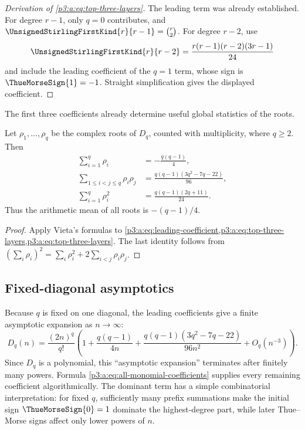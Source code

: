 \documentclass[11pt,oneside]{article}
\numberwithin{equation}{section}
\theoremstyle{definition}
\theoremstyle{remark}
\begin{document}
\begin{proof}[Derivation of \eqref{p3:a:eq:top-three-layers}]
The leading term was already established.  For degree \(r-1\), only \(q=0\)
contributes, and
\(
\UnsignedStirlingFirstKind{r}{r-1}=\binom r2
\).
For degree \(r-2\), use
\[
 \UnsignedStirlingFirstKind{r}{r-2}
 =\frac{r(r-1)(r-2)(3r-1)}{24}
\]
and include the leading coefficient of the \(q=1\) term, whose sign is
\(\ThueMorseSign{1}=-1\).  Straight simplification gives the displayed coefficient.
\end{proof}
The first three coefficients already determine useful global statistics of
the roots.

\begin{corollary}
Let \(\rho_1,\ldots,\rho_q\) be the complex roots of \(D_q\), counted
with multiplicity, where \(q\geq2\).  Then
\begin{align}
 \sum_{i=1}^{q}\rho_i
   &=-\frac{q(q-1)}4,                                      \label{p3:c:eq:root-sum}\\
 \sum_{1\leq i<j\leq q}\rho_i\rho_j
   &=\frac{q(q-1)(3q^2-7q-22)}{96},                        \label{p3:c:eq:root-e2}\\
 \sum_{i=1}^{q}\rho_i^2
   &=\frac{q(q-1)(2q+11)}{24}.                             \label{p3:c:eq:root-square-sum}
\end{align}
Thus the arithmetic mean of all roots is \(-(q-1)/4\).
\end{corollary}

\begin{proof}
Apply Vieta's formulas to \cref{p3:a:eq:leading-coefficient,p3:a:eq:top-three-layers,p3:a:eq:top-three-layers}.  The last
identity follows from
\((\sum_i\rho_i)^2=\sum_i\rho_i^2+2\sum_{i<j}\rho_i\rho_j\).
\end{proof}
\subsection{Fixed-diagonal asymptotics}

Because \(q\) is fixed on one diagonal, the leading coefficients give a
finite asymptotic expansion as \(n\to\infty\):
\begin{equation}
 D_q(n)=\frac{(2n)^q}{q!}
 \left(
 1+\frac{q(q-1)}{4n}
 +\frac{q(q-1)(3q^2-7q-22)}{96n^2}
 +O_q(n^{-3})
 \right).                                                  \label{p3:c:eq:diag-asymp}
\end{equation}
Since \(D_q\) is a polynomial, this ``asymptotic expansion'' terminates
after finitely many powers.  Formula \cref{p3:a:eq:all-monomial-coefficients} supplies every
remaining coefficient algorithmically.  The dominant term has a simple
combinatorial interpretation: for fixed \(q\), sufficiently many prefix
summations make the initial sign \(\ThueMorseSign{0}=1\) dominate the highest-degree
part, while later Thue--Morse signs affect only lower powers of \(n\).
\end{document}
